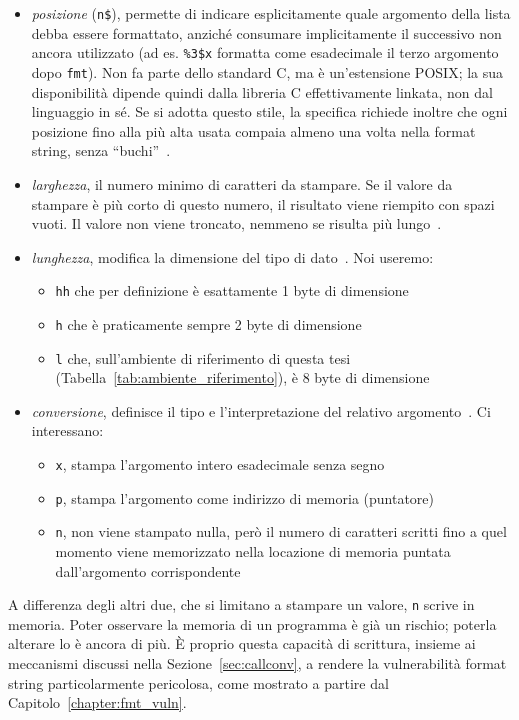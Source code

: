 \begin{itemize}
    \item \emph{posizione} (\texttt{n\$}), permette di indicare esplicitamente quale argomento della lista debba essere formattato, anziché consumare implicitamente il successivo non ancora utilizzato (ad es. \texttt{\%3\$x} formatta come esadecimale il terzo argomento dopo \texttt{fmt}). Non fa parte dello standard C, ma è un'estensione POSIX; la sua disponibilità dipende quindi dalla libreria C effettivamente linkata, non dal linguaggio in sé. Se si adotta questo stile, la specifica richiede inoltre che ogni posizione fino alla più alta usata compaia almeno una volta nella format string, senza ``buchi''~\cite{man3printf}.
    \item \emph{larghezza}, il numero minimo di caratteri da stampare. Se il valore da stampare è più corto di questo numero, il risultato viene riempito con spazi vuoti. Il valore non viene troncato, nemmeno se risulta più lungo~\cite{man3printf}.
    \item \emph{lunghezza}, modifica la dimensione del tipo di dato~\cite{man3printf}. Noi useremo:
        \begin{itemize}
            \item \texttt{hh} che per definizione è esattamente 1 byte di dimensione
            \item \texttt{h} che è praticamente sempre 2 byte di dimensione
            \item \texttt{l} che, sull'ambiente di riferimento di questa tesi (Tabella~\ref{tab:ambiente_riferimento}), è 8 byte di dimensione
        \end{itemize}

    \item \emph{conversione}, definisce il tipo e l'interpretazione del relativo argomento~\cite{man3printf}. Ci interessano:
        \begin{itemize}
            \item \texttt{x}, stampa l'argomento intero esadecimale senza segno
            \item \texttt{p}, stampa l'argomento come indirizzo di memoria (puntatore)
            \item \texttt{n}, non viene stampato nulla, però il numero di caratteri scritti fino a quel momento viene memorizzato nella locazione di memoria puntata dall'argomento corrispondente
        \end{itemize}
\end{itemize}
A differenza degli altri due, che si limitano a stampare un valore, \texttt{n} scrive in memoria. Poter osservare la memoria di un programma è già un rischio; poterla alterare lo è ancora di più. È proprio questa capacità di scrittura, insieme ai meccanismi discussi nella Sezione~\ref{sec:callconv}, a rendere la vulnerabilità format string particolarmente pericolosa, come mostrato a partire dal Capitolo~\ref{chapter:fmt_vuln}.


